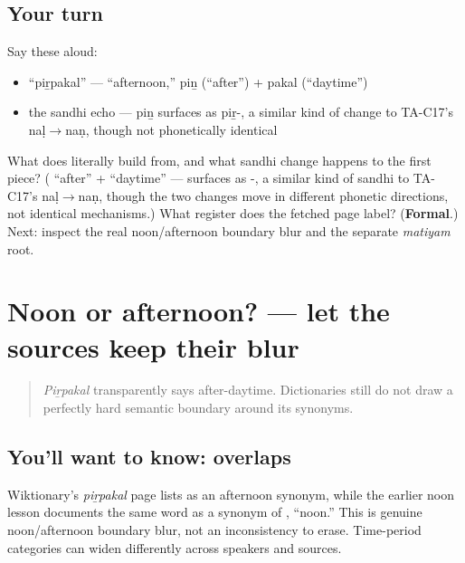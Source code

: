 \subsection*{Your turn}
Say these aloud:

\begin{itemize}
\raggedright
  \item \textquotedblleft{}piṟpakal\textquotedblright{} — \textquotedblleft{}afternoon,\textquotedblright{} piṉ (\textquotedblleft{}after\textquotedblright{}) + pakal (\textquotedblleft{}daytime\textquotedblright{})
  \item the sandhi echo — piṉ surfaces as piṟ-, a similar kind of change to TA-C17's naḷ$\to$naṇ, though not phonetically identical
\end{itemize}

\begin{tcolorbox}[breakable,colback=teal!4,colframe=teal!35!black,title={Before you move on}]
What does  literally build from, and what sandhi change happens to the first piece? (\textbf{} \textquotedblleft{}after\textquotedblright{} +  \textquotedblleft{}daytime\textquotedblright{} —  surfaces as -, a similar kind of sandhi to TA-C17's naḷ$\to$naṇ, though the two changes move in different phonetic directions, not identical mechanisms.) What register does the fetched page label? (\textbf{Formal}.) Next: inspect the real noon/afternoon boundary blur and the separate \emph{matiyam} root.
\end{tcolorbox}
\section[\texorpdfstring{\ta{நடுப்பகல்} / \ta{மதியம்} (naṭuppakal / matiyam)}{நடுப்பகல் / மதியம் (naṭuppakal / matiyam)}]{Noon or afternoon? — let the sources keep their blur}

\label{lesson:TA-C28-afternoon-boundary}



\begin{quote}
\emph{Piṟpakal} transparently says after-daytime. Dictionaries still do not draw a perfectly hard semantic boundary around its synonyms.
\end{quote}

\subsection*{You'll want to know:  overlaps}
Wiktionary's \emph{piṟpakal} page lists \textbf{} as an afternoon synonym, while the earlier noon lesson documents the same word as a synonym of \textbf{}, \textquotedblleft{}noon.\textquotedblright{} This is genuine noon/afternoon boundary blur, not an inconsistency to erase. Time-period categories can widen differently across speakers and sources.

